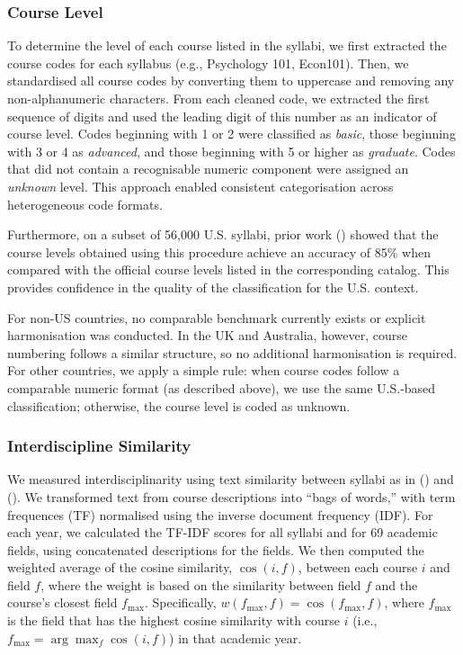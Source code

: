 \documentclass[
  british,
  12pt,
]{article}
\begin{document}
\subsubsection{Course Level}\label{course-level}

To determine the level of each course listed in the syllabi, we first extracted the course codes for each syllabus (e.g., Psychology 101, Econ101). Then, we standardised all course codes by converting them to uppercase and removing any non-alphanumeric characters. From each cleaned code, we extracted the first sequence of digits and used the leading digit of this number as an indicator of course level. Codes beginning with 1 or 2 were classified as \emph{basic}, those beginning with 3 or 4 as \emph{advanced}, and those beginning with 5 or higher as \emph{graduate}. Codes that did not contain a recognisable numeric component were assigned an \emph{unknown} level. This approach enabled consistent categorisation across heterogeneous code formats.

Furthermore, on a subset of 56,000 U.S. syllabi, prior work () showed that the course levels obtained using this procedure achieve an accuracy of 85\% when compared with the official course levels listed in the corresponding catalog. This provides confidence in the quality of the classification for the U.S. context.

For non-US countries, no comparable benchmark currently exists or explicit harmonisation was conducted. In the UK and Australia, however, course numbering follows a similar structure, so no additional harmonisation is required. For other countries, we apply a simple rule: when course codes follow a comparable numeric format (as described above), we use the same U.S.-based classification; otherwise, the course level is coded as unknown.

\subsubsection{Interdiscipline Similarity}\label{si-interdisciplinarity}

We measured interdisciplinarity using text similarity between syllabi as in () and (). We transformed text from course descriptions into ``bags of words,'' with term frequences (TF) normalised using the inverse document frequency (IDF). For each year, we calculated the TF-IDF scores for all syllabi and for 69 academic fields, using concatenated descriptions for the fields. We then computed the weighted average of the cosine similarity, \(\cos (i, f)\), between each course \(i\) and field \(f\), where the weight is based on the similarity between field \(f\) and the course's closest field \(f_{\max}\). Specifically, \(w(f_{\max}, f) = \cos(f_{\max}, f)\), where \(f_{\max}\) is the field that has the highest cosine similarity with course \(i\) (i.e., \(f_{\max} = \arg\max_f \cos(i, f)\)) in that academic year.
\end{document}
